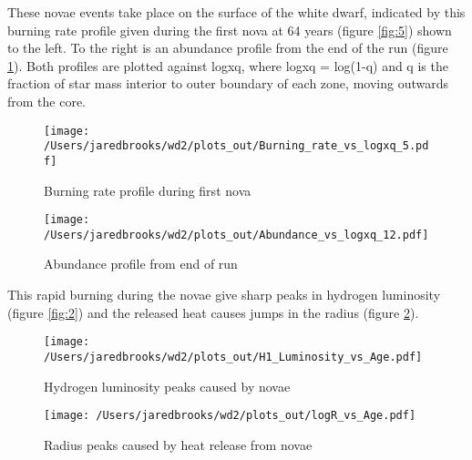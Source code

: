 \documentclass{article}
\begin{document}
        \pagebreak

        These novae events take place on the surface of the white dwarf, indicated by this burning rate profile given during the first nova at 64 years (figure \ref{fig:5}) shown to the left.  To the right is an abundance profile from the end of the run (figure \ref{fig:7}).  Both profiles are plotted against logxq, where logxq = log(1-q) and q is the fraction of star mass interior to outer boundary of each zone, moving outwards from the core.

        \begin{figure}[H]
          \begin{minipage}[b]{0.5\linewidth}
            \centering
            \texttt{[image: /Users/jaredbrooks/wd2/plots\_out/Burning\_rate\_vs\_logxq\_5.pdf]}
            \caption{Burning rate profile during first nova}
            \label{fig:5}
          \end{minipage}
          \hspace{0cm}
          \begin{minipage}[b]{0.5\linewidth}
            \centering
            \texttt{[image: /Users/jaredbrooks/wd2/plots\_out/Abundance\_vs\_logxq\_12.pdf]}
            \caption{Abundance profile from end of run}
            \label{fig:7}
          \end{minipage}
          \end{figure}

        This rapid burning during the novae give sharp peaks in hydrogen luminosity (figure \ref{fig:2}) and the released heat causes jumps in the radius (figure \ref{fig:3}).
        
        \begin{figure}[H]
          \begin{minipage}[b]{0.5\linewidth}
            \centering
            \texttt{[image: /Users/jaredbrooks/wd2/plots\_out/H1\_Luminosity\_vs\_Age.pdf]}
            \caption{\footnotesize Hydrogen luminosity peaks caused by novae}
            \label{fig:2}
          \end{minipage}
          \hspace{0cm}
          \begin{minipage}[b]{0.5\linewidth}
            \centering
            \texttt{[image: /Users/jaredbrooks/wd2/plots\_out/logR\_vs\_Age.pdf]}
            \caption{\footnotesize Radius peaks caused by heat release from novae}
            \label{fig:3}
          \end{minipage}
        \end{figure}
\end{document}
